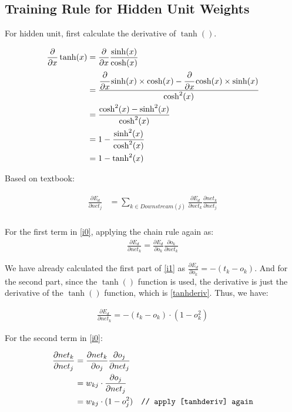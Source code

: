 \documentclass[preview]{standalone}
\begin{document}
\subsection{Training Rule for Hidden Unit Weights}
For hidden unit, first calculate the derivative of $\tanh()$.

\begin{align}
\label{tanhderiv}
\begin{split}
\frac{\partial}{\partial x}\tanh(x)
&=\frac{\partial}{\partial x}\frac{\sinh(x)}{\cosh(x)}\\
&=\cfrac{\cfrac{\partial}{\partial
    x}\sinh(x)\times\cosh(x)-\cfrac{\partial}{\partial
    x}\cosh(x)\times\sinh(x)}{\cosh^2(x)}\\
&=\frac{\cosh^2(x)-\sinh^2(x)}{\cosh^2(x)}\\
&=1-\frac{\sinh^2(x)}{\cosh^2(x)}\\
&=1-\tanh^2(x)
\end{split}
\end{align}

Based on textbook:

\begin{align}
\label{i0}
\begin{split}
\frac{\partial E_d}{\partial net_j}
&=\sum_{{k}\in{Downstream(j)}}\frac{\partial E_d}{\partial net_{{k}}}\frac{\partial net_{{k}}}{\partial net_{j}}\\
\end{split}
\end{align}

For the first term in \cref{i0}, applying the chain rule again as:
\begin{align}
\label{i1}
\frac{\partial E_d}{\partial net_{{k}}}=\frac{\partial E_d}{\partial
o_{{k}}}\frac{\partial o_{{k}}}{\partial net_{{k}}}
\end{align}

We have already calculated the first part of \cref{i1} as
$\displaystyle\frac{\partial E_d}{\partial o_{{k}}}=-(t_{{k}}-o_{{k}})$. And
for the second part, since the $\tanh()$ function is used, the derivative is
just the derivative of the $\tanh()$ function, which is \cref{tanhderiv}. Thus,
we have:

\begin{align}
\label{i2}
\frac{\partial E_d}{\partial net_{{k}}}=-(t_{{k}}-o_{{k}})\cdot(1-o_{{k}}^2)
\end{align}

For the second term in \cref{i0}:

\begin{align}
\label{i3}
\begin{split}
\frac{\partial net_{{k}}}{\partial net_{j}}
&= \frac{\partial net_{{k}}}{\partial o_j}\frac{\partial o_j}{\partial net_{j}}\\
&= w_{{kj}}\cdot\frac{\partial o_j}{\partial net_{j}}\\
&= w_{{kj}}\cdot(1-o_j^2)\quad\texttt{// apply \cref{tanhderiv} again}
\end{split}
\end{align}
\end{document}
